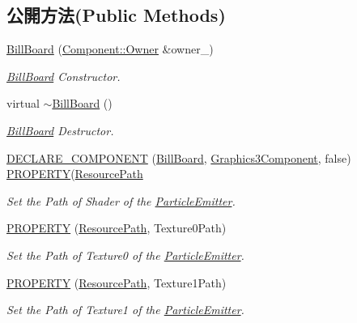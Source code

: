\subsection*{公開方法(Public Methods)}
\begin{DoxyCompactItemize}
\item 
\hyperlink{class_magnum_1_1_bill_board_a484900d8c24d851cfccf6b435886a2a4}{Bill\+Board} (\hyperlink{class_magnum_1_1_component_1_1_owner}{Component\+::\+Owner} \&owner\+\_\+)
\begin{DoxyCompactList}\small\item\em \hyperlink{class_magnum_1_1_bill_board}{Bill\+Board} Constructor. \end{DoxyCompactList}\item 
virtual \hyperlink{class_magnum_1_1_bill_board_ab84fd0e03cde0a0f6444cc9d601bd99f}{$\sim$\+Bill\+Board} ()
\begin{DoxyCompactList}\small\item\em \hyperlink{class_magnum_1_1_bill_board}{Bill\+Board} Destructor. \end{DoxyCompactList}\item 
\hyperlink{class_magnum_1_1_bill_board_ac58229945b125e3174f5672ec9f968e6}{D\+E\+C\+L\+A\+R\+E\+\_\+\+C\+O\+M\+P\+O\+N\+E\+NT} (\hyperlink{class_magnum_1_1_bill_board}{Bill\+Board}, \hyperlink{class_magnum_1_1_graphics3_component}{Graphics3\+Component}, false)       \hyperlink{class_magnum_1_1_bill_board_ae7043fbb37878e815ee4515567a16c32}{P\+R\+O\+P\+E\+R\+TY}(\hyperlink{class_magnum_1_1_resource_path}{Resource\+Path}
\begin{DoxyCompactList}\small\item\em Set the Path of Shader of the \hyperlink{class_magnum_1_1_particle_emitter}{Particle\+Emitter}. \end{DoxyCompactList}\item 
\hyperlink{class_magnum_1_1_bill_board_ae7043fbb37878e815ee4515567a16c32}{P\+R\+O\+P\+E\+R\+TY} (\hyperlink{class_magnum_1_1_resource_path}{Resource\+Path}, Texture0\+Path)
\begin{DoxyCompactList}\small\item\em Set the Path of Texture0 of the \hyperlink{class_magnum_1_1_particle_emitter}{Particle\+Emitter}. \end{DoxyCompactList}\item 
\hyperlink{class_magnum_1_1_bill_board_a4d7116d7456bf82e1e893636a18ae388}{P\+R\+O\+P\+E\+R\+TY} (\hyperlink{class_magnum_1_1_resource_path}{Resource\+Path}, Texture1\+Path)
\begin{DoxyCompactList}\small\item\em Set the Path of Texture1 of the \hyperlink{class_magnum_1_1_particle_emitter}{Particle\+Emitter}. \end{DoxyCompactList}\item 

\end{DoxyCompactItemize}
